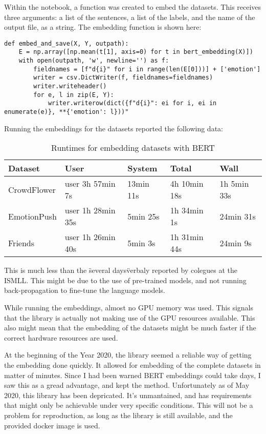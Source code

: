 Within the notebook, a function was created to embed the datasets. This receives three arguments: a list of the sentences, a list of the labels, and the name of the output file, as a string. The embedding function is shown here:

\begin{lstlisting}[caption={Embedding with BERT},label=lst:embed_bert,frame=single]
def embed_and_save(X, Y, outpath):
    E = np.array([np.mean(t[1], axis=0) for t in bert_embedding(X)])
    with open(outpath, 'w', newline='') as f:
        fieldnames = [f"d{i}" for i in range(len(E[0]))] + ['emotion']
        writer = csv.DictWriter(f, fieldnames=fieldnames)
        writer.writeheader()
        for e, l in zip(E, Y):
            writer.writerow(dict({f"d{i}": ei for i, ei in enumerate(e)}, **{'emotion': l}))"
\end{lstlisting}

Running the embeddings for the datasets reported the following data:

\begin{table}[H]
  \begin{tabular}{lllll}
  Dataset                          & User              & System    & Total        & Wall        \\
  \hline
  \multicolumn{1}{l|}{CrowdFlower} & user 3h 57min 7s  & 13min 11s & 4h 10min 18s & 1h 5min 33s \\
  \multicolumn{1}{l|}{EmotionPush} & user 1h 28min 35s & 5min 25s  & 1h 34min 1s &  24min 31s   \\
  \multicolumn{1}{l|}{Friends    } & user 1h 26min 40s & 5min 3s   & 1h 31min 44s & 24min 9s
  \end{tabular}
  \caption{Runtimes for embedding datasets with BERT}\label{tab:rt_BERT}
\end{table}

This is much less than the \"several days\" verbaly reported by colegues at the ISMLL. This might be due to the use of pre-trained models, and not running back-propagation to fine-tune the language models.

While running the embeddings, almost no GPU memory was used. This signals that the library is actually not making use of the GPU resources available. This also might mean that the embedding of the datasets might be much faster if the correct hardware resources are used.

At the beginning of the Year 2020, the library seemed a reliable way of getting the embedding done quickly. It allowed for embedding of the complete datasets in matter of minutes. Since I had been warned BERT embeddings could take days, I saw this as a gread advantage, and kept the method. Unfortunately as of May 2020, this library has been depricated. It's unmantained, and has requirements that might only be achievable under very specific conditions. This will not be a problem for reproduction, as long as the library is still available, and the provided docker image is used.

